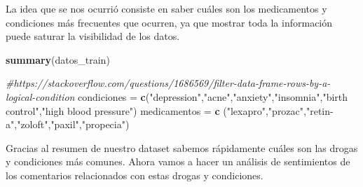 \documentclass[spanish,]{article}
\newenvironment{Shaded}{\begin{snugshade}}{\end{snugshade}}
\newcommand{\KeywordTok}[1]{\textcolor[rgb]{0.13,0.29,0.53}{\textbf{#1}}}
\newcommand{\StringTok}[1]{\textcolor[rgb]{0.31,0.60,0.02}{#1}}
\newcommand{\CommentTok}[1]{\textcolor[rgb]{0.56,0.35,0.01}{\textit{#1}}}
\newcommand{\NormalTok}[1]{#1}
\begin{document}
La idea que se nos ocurrió consiste en saber cuáles son los medicamentos
y condiciones más frecuentes que ocurren, ya que mostrar toda la
información puede saturar la visibilidad de los datos.

\begin{Shaded}
\begin{Highlighting}[]
\KeywordTok{summary}\NormalTok{(datos_train)}

\CommentTok{#https://stackoverflow.com/questions/1686569/filter-data-frame-rows-by-a-logical-condition}
\NormalTok{condiciones =}\StringTok{ }\KeywordTok{c}\NormalTok{(}\StringTok{"depression"}\NormalTok{,}\StringTok{"acne"}\NormalTok{,}\StringTok{"anxiety"}\NormalTok{,}\StringTok{"insomnia"}\NormalTok{,}\StringTok{"birth control"}\NormalTok{,}\StringTok{"high blood pressure"}\NormalTok{)}
\NormalTok{medicamentos =}\StringTok{ }\KeywordTok{c}\NormalTok{ (}\StringTok{"lexapro"}\NormalTok{,}\StringTok{"prozac"}\NormalTok{,}\StringTok{"retin-a"}\NormalTok{,}\StringTok{"zoloft"}\NormalTok{,}\StringTok{"paxil"}\NormalTok{,}\StringTok{"propecia"}\NormalTok{)}
\end{Highlighting}
\end{Shaded}

Gracias al resumen de nuestro dataset sabemos rápidamente cuáles son las
drogas y condiciones más comunes. Ahora vamos a hacer un análisis de
sentimientos de los comentarios relacionados con estas drogas y
condiciones.
\end{document}
